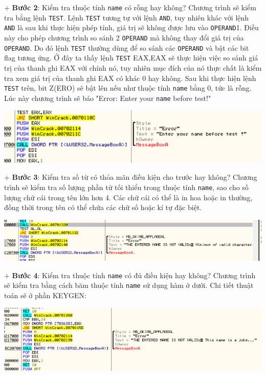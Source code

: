 + \textbf{Bước 2}: Kiểm tra thuộc tính \texttt{name} có rỗng hay không? Chương trình sẽ kiểm tra bằng lệnh \texttt{TEST}. Lệnh \texttt{TEST} tương tự với lệnh \texttt{AND}, tuy nhiên khác với lệnh \texttt{AND} là sau khi thực hiện phép tính, giá trị sẽ không được lưu vào \texttt{OPERAND}1. Điều này cho phép chương trình so sánh 2 \texttt{OPERAND} mà không thay đổi giá trị của \texttt{OPERAND}. Do đó lệnh \texttt{TEST} thường dùng để so sánh các \texttt{OPERAND} và bật các bit flag tương ứng. Ở đây ta thấy lệnh {\texttt{TEST} EAX,EAX} sẽ thực hiện việc so sánh giá trị của thanh ghi EAX với chính nó, tuy nhiên mục đích của nó thực chất là kiểm tra xem giá trị của thanh ghi EAX có khác 0 hay không. Sau khi thực hiện lệnh \texttt{TEST} trên, bit Z(ERO) sẽ bật lên nếu như thuộc tính \texttt{name} bằng 0, tức là rỗng. Lúc này chương trình sẽ báo "Error: Enter your \texttt{name} before test!"\\
\begin{center}
    \includegraphics[width=\textwidth]{img/file-2/asm4.PNG}
\end{center}
+ \textbf{Bước 3}: Kiểm tra số từ có thỏa mãn điều kiện cho trước hay không? Chương trình sẽ kiểm tra số lượng phần tử tối thiểu trong thuộc tính \texttt{name}, sao cho số lượng chữ cái trong tên lớn hơn 4. Các chữ cái có thể là in hoa hoặc in thường, đồng thời trong tên có thể chứa các chữ số hoặc kí tự đặc biệt.\\
\begin{center}
    \includegraphics[width=\textwidth]{img/file-2/asm5.PNG}
\end{center}
+ \textbf{Bước 4}: Kiểm tra thuộc tính \texttt{name} có đủ điều kiện hay không?
Chương trình sẽ kiểm tra bằng cách băm thuộc tính \texttt{name} sử dụng hàm ở dưới. Chi tiết thuật toán sẽ ở phần KEYGEN:\\
\begin{center}
    \includegraphics[width=\textwidth]{img/file-2/asm6.PNG}
\end{center}

